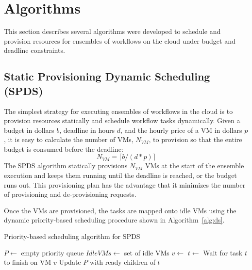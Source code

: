 \documentclass[conference]{IEEEtran}
\begin{document}
\section{Algorithms}
\label{sec:algorithms}

This section describes several algorithms were developed to schedule and provision resources for ensembles of workflows on the cloud under budget and deadline constraints.

\subsection{Static Provisioning Dynamic Scheduling (SPDS) }
\label{sec:spds}

The simplest strategy for executing ensembles of workflows in the cloud is to provision resources statically and schedule workflow tasks dynamically. Given a budget in dollars $b$, deadline in hours $d$, and the hourly price of a VM in dollars $p$, it is easy to calculate the number of VMs, $N_{VM}$, to provision so that the entire budget is consumed before the deadline:
%
\begin{equation}
\label{eq:static-plan}
N_{VM} = \lceil b / (d * p) \rceil
\end{equation}
%
The SPDS algorithm statically provisions $N_{VM}$ VMs at the start of the ensemble execution and keeps them running until the deadline is reached, or the budget runs out. This provisioning plan has the advantage that it minimizes the number of provisioning and de-provisioning requests.

Once the VMs are provisioned, the tasks are mapped onto idle VMs using the dynamic priority-based scheduling procedure shown in Algorithm~\ref{alg:ds}.

\begin{algorithm}[tb]
\caption{Priority-based scheduling algorithm for SPDS}
\label{alg:ds}
\begin{algorithmic}[1]
    \State $P\gets$ empty priority queue
	\State $IdleVMs\gets$ set of idle VMs
    	\State {} 
    \EndFor
    		\State $v\gets$ 
    		\State $t\gets$ 
    		\State {}
    	\EndWhile
    	\State Wait for task $t$ to finish on VM $v$
    	\State Update $P$ with ready children of $t$
		\State {}
    \EndWhile
\EndProcedure
\end{algorithmic} 
\end{algorithm}
\end{document}
